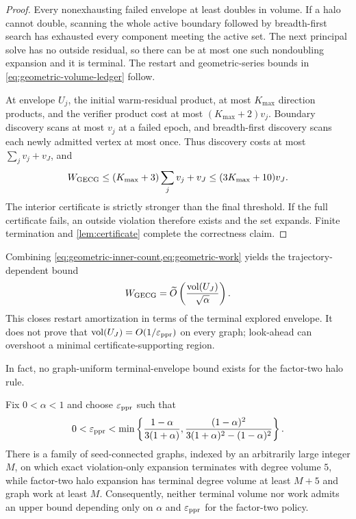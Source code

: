 \documentclass[11pt]{article}
\begin{document}
\begin{proof}
Every nonexhausting failed envelope at least doubles in volume. If a halo
cannot double, scanning the whole active boundary followed by breadth-first
search has exhausted every component meeting the active set. The next
principal solve has no outside residual, so there can be at most one such
nondoubling expansion and it is terminal. The restart and geometric-series
bounds in \cref{eq:geometric-volume-ledger} follow.

At envelope $U_j$, the initial warm-residual product, at most $K_{\max}$
direction products, and the verifier product cost at most
$(K_{\max}+2)v_j$. Boundary discovery scans at most $v_j$ at a failed epoch,
and breadth-first discovery scans each newly admitted vertex at most once.
Thus discovery costs at most $\sum_jv_j+v_J$, and
\begin{equation*}
 W_{\rm GECG}
 \leq(K_{\max}+3)\sum_jv_j+v_J
 \leq(3K_{\max}+10)v_J.
\end{equation*}
The interior certificate is strictly stronger than the final threshold. If
the full certificate fails, an outside violation therefore exists and the
set expands. Finite termination and \cref{lem:certificate} complete the
correctness claim.
\end{proof}

Combining \cref{eq:geometric-inner-count,eq:geometric-work} yields the
trajectory-dependent bound
\begin{equation}
 W_{\rm GECG}
 =\widetilde O\left(\frac{\operatorname{vol}(U_J)}{\sqrt\alpha}\right).
 \label{eq:geometric-conditional-work}
\end{equation}
This closes restart amortization in terms of the terminal explored envelope.
It does not prove that $\operatorname{vol}(U_J)=O(1/\varepsilon_{\mathrm{ppr}})$ on every graph; look-ahead can
overshoot a minimal certificate-supporting region.

In fact, no graph-uniform terminal-envelope bound exists for the factor-two
halo rule.

\begin{proposition}
\label{prop:decoy-obstruction}
Fix $0<\alpha<1$ and choose $\varepsilon_{\mathrm{ppr}}$ such that
\begin{equation}
 0<\varepsilon_{\mathrm{ppr}}<\min\left\{
 \frac{1-\alpha}{3(1+\alpha)},
 \frac{(1-\alpha)^2}
 {3(1+\alpha)^2-(1-\alpha)^2}
 \right\}.
 \label{eq:decoy-epsilon-range}
\end{equation}
There is a family of seed-connected graphs, indexed by an arbitrarily large
integer $M$, on which exact violation-only expansion terminates with degree
volume $5$, while factor-two halo expansion has terminal degree volume at
least $M+5$ and graph work at least $M$. Consequently, neither terminal
volume nor work admits an upper bound depending only on $\alpha$ and
$\varepsilon_{\mathrm{ppr}}$ for the factor-two policy.
\end{proposition}
\end{document}
